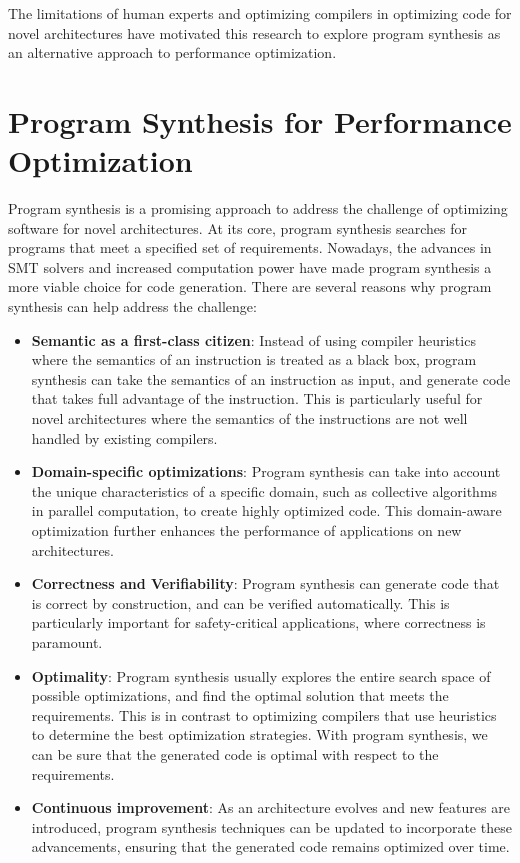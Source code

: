 The limitations of human experts and optimizing compilers in
optimizing code for novel architectures have motivated this research
to explore program synthesis as an alternative approach to
performance optimization.

\section{Program Synthesis for Performance Optimization}

Program synthesis is a promising approach to address the challenge of
optimizing software for novel architectures.
%
At its core, program synthesis searches for programs that meet a
specified set of requirements.
%
Nowadays, the advances in SMT solvers and increased computation power
have made program synthesis a more viable choice for code generation.
%
There are several reasons why program synthesis can help address the
challenge:

\begin{itemize}
    \item \textbf{Semantic as a first-class citizen}: Instead of using
    compiler heuristics where the semantics of an instruction is treated
    as a black box, program synthesis can take the semantics of an
    instruction as input, and generate code that takes full advantage
    of the instruction. This is particularly useful for novel
    architectures where the semantics of the instructions are not well
    handled by existing compilers.

    \item \textbf{Domain-specific optimizations}: Program synthesis
    can take into account the unique characteristics of a specific
    domain, such as collective algorithms in parallel computation, to
    create highly optimized code.
    This domain-aware optimization further enhances the performance of
    applications on new architectures.

    \item \textbf{Correctness and Verifiability}: Program synthesis
    can generate code that is correct by construction, and can be
    verified automatically.
    This is particularly important for safety-critical applications,
    where correctness is paramount.

    \item \textbf{Optimality}: Program synthesis usually explores the
    entire search space of possible optimizations, and find the
    optimal solution that meets the requirements. This is in contrast
    to optimizing compilers that use heuristics to determine the best
    optimization strategies. With program synthesis, we can be sure
    that the generated code is optimal with respect to the
    requirements.

    \item \textbf{Continuous improvement}: As an architecture evolves
    and new features are introduced, program synthesis techniques can
    be updated to incorporate these advancements, ensuring that the
    generated code remains optimized over time.
\end{itemize}

